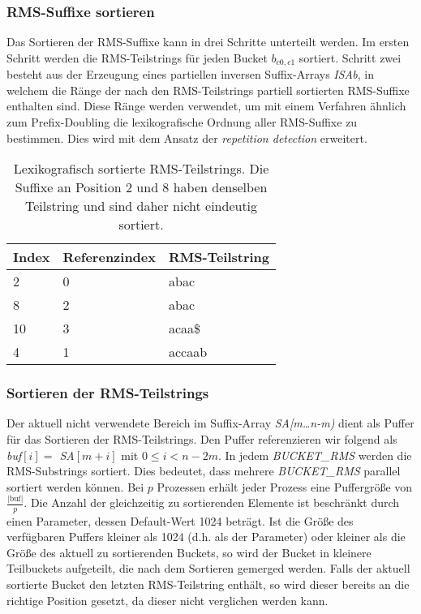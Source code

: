 \subsubsection{RMS-Suffixe sortieren}
Das Sortieren der RMS-Suffixe kann in drei Schritte unterteilt werden. Im ersten Schritt werden die RMS-Teilstrings für jeden Bucket $b_{c0,c1}$ sortiert. Schritt zwei besteht aus der Erzeugung eines partiellen inversen Suffix-Arrays \textit{ISAb}, in welchem die Ränge der nach den RMS-Teilstrings partiell sortierten RMS-Suffixe enthalten sind. Diese Ränge werden verwendet, um mit einem Verfahren ähnlich zum Prefix-Doubling die lexikografische Ordnung aller RMS-Suffixe zu bestimmen. Dies wird mit dem Ansatz der \textit{repetition detection} erweitert.

\begin{table}
	\begin{tabular}{l|l|l}
		Index & Referenzindex & RMS-Teilstring \\ \hline
		2     & 0             & abac           \\ \hline
		8     & 2             & abac           \\ \hline
		10    & 3             & acaa\$         \\ \hline
		4     & 1             & accaab         \\ \hline
	\end{tabular}
	\caption{Lexikografisch sortierte RMS-Teilstrings. Die Suffixe an Position 2 und 8 haben denselben Teilstring und sind daher nicht eindeutig sortiert.}
	\label{dss:table:substrings}
\end{table}

\subsubsection{Sortieren der RMS-Teilstrings}
Der aktuell nicht verwendete Bereich im Suffix-Array \textit{SA[m\dots n-m)} dient als Puffer für das Sortieren der RMS-Teilstrings. Den Puffer referenzieren wir folgend als \textit{buf$[i] = $ SA$[m+i]$} mit $0 \leq i < n - 2m$. In jedem \textit{BUCK\-ET\_RMS} werden die RMS-Substrings sortiert. Dies bedeutet, dass mehrere \textit{BUCK\-ET\_RMS} parallel sortiert werden können. Bei $p$ Prozessen erhält jeder Prozess eine Puffergröße von $\frac{|\text{buf}|}{p}$. Die Anzahl der gleichzeitig zu sortierenden Elemente ist beschränkt durch einen Parameter, dessen Default-Wert 1024 beträgt. Ist die Größe des verfügbaren Puffers kleiner als 1024 (d.h. als der Parameter) oder kleiner als die Größe des aktuell zu sortierenden Buckets, so wird der Bucket in kleinere Teilbuckets aufgeteilt, die nach dem Sortieren gemerged werden. Falls der aktuell sortierte Bucket den letzten RMS-Teilstring enthält, so wird dieser bereits an die richtige Position gesetzt, da dieser nicht verglichen werden kann. 


